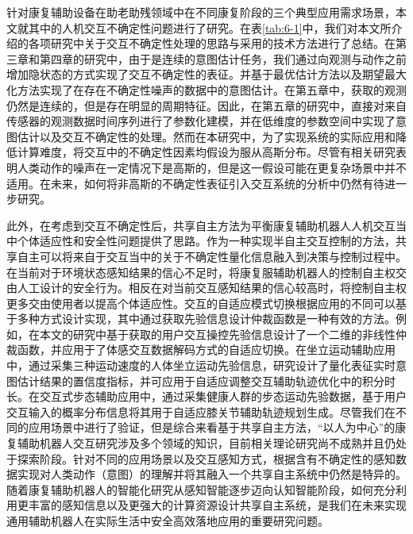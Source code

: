 针对康复辅助设备在助老助残领域中在不同康复阶段的三个典型应用需求场景，本文就其中的人机交互不确定性问题进行了研究。在表\ref{tab:6-1}中，我们对本文所介绍的各项研究中关于交互不确定性处理的思路与采用的技术方法进行了总结。在第三章和第四章的研究中，由于是连续的意图估计任务，我们通过向观测与动作之前增加隐状态的方式实现了交互不确定性的表征。并基于最优估计方法以及期望最大化方法实现了在存在不确定性噪声的数据中的意图估计。在第五章中，获取的观测仍然是连续的，但是存在明显的周期特征。因此，在第五章的研究中，直接对来自传感器的观测数据时间序列进行了参数化建模，并在低维度的参数空间中实现了意图估计以及交互不确定性的处理。然而在本研究中，为了实现系统的实际应用和降低计算难度，将交互中的不确定性因素均假设为服从高斯分布。尽管有相关研究表明人类动作的噪声在一定情况下是高斯的，但是这一假设可能在更复杂场景中并不适用。在未来，如何将非高斯的不确定性表征引入交互系统的分析中仍然有待进一步研究。

此外，在考虑到交互不确定性后，共享自主方法为平衡康复辅助机器人人机交互当中个体适应性和安全性问题提供了思路。作为一种实现半自主交互控制的方法，共享自主可以将来自于交互当中的关于不确定性量化信息融入到决策与控制过程中。在当前对于环境状态感知结果的信心不足时，将康复服辅助机器人的控制自主权交由人工设计的安全行为。相反在对当前交互感知结果的信心较高时，将控制自主权更多交由使用者以提高个体适应性。交互的自适应模式切换根据应用的不同可以基于多种方式设计实现，其中通过获取先验信息设计仲裁函数是一种有效的方法。例如，在本文的研究中基于获取的用户交互操控先验信息设计了一个二维的非线性仲裁函数，并应用于了体感交互数据解码方式的自适应切换。在坐立运动辅助应用中，通过采集三种运动速度的人体坐立运动先验信息，研究设计了量化表征实时意图估计结果的置信度指标，并可应用于自适应调整交互辅助轨迹优化中的积分时长。在交互式步态辅助应用中，通过采集健康人群的步态运动先验数据，基于用户交互输入的概率分布信息将其用于自适应膝关节辅助轨迹规划生成。尽管我们在不同的应用场景中进行了验证，但是综合来看基于共享自主方法，``以人为中心''的康复辅助机器人交互研究涉及多个领域的知识，目前相关理论研究尚不成熟并且仍处于探索阶段。针对不同的应用场景以及交互感知方式，根据含有不确定性的感知数据实现对人类动作（意图）的理解并将其融入一个共享自主系统中仍然是特异的。随着康复辅助机器人的智能化研究从感知智能逐步迈向认知智能阶段，如何充分利用更丰富的感知信息以及更强大的计算资源设计共享自主系统，是我们在未来实现通用辅助机器人在实际生活中安全高效落地应用的重要研究问题。
